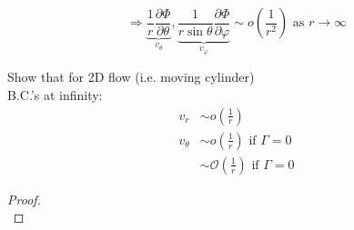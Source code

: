 \begin{equation}
\Longrightarrow\underbrace{\frac{1}{r}\frac{\partial\Phi}{\partial\theta}}_{v_\theta},\underbrace{\frac{1}{r\sin\theta}\frac{\partial\Phi}{\partial \varphi}}_{v_\varphi}\sim o\left(\frac{1}{r^2}\right)\text{ as }r\to\infty
\end{equation}
\begin{exercise}{Show that for 2D flow (i.e. moving cylinder)}\mbox{}\\
B.C.'s at infinity:
\begin{align*}
v_r &\sim o\left(\frac{1}{r}\right) \\
v_\theta &\sim o\left(\frac{1}{r}\right)\text{ if }\Gamma = 0 \\
&\sim \mathcal{O}\left(\frac{1}{r}\right)\text{ if }\Gamma = 0
\end{align*}
\begin{proof}\mbox{}\\


\end{proof}
\end{exercise}
